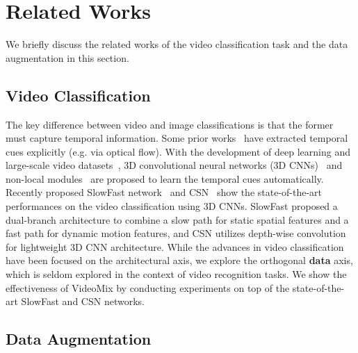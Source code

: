 \section{Related Works}
\label{section:related_works}

We briefly discuss the related works of the video classification task and the data augmentation in this section. 

\subsection{Video Classification}

The key difference between video and image classifications is that the former must capture temporal information.
Some prior works~\cite{simonyan2014two,feichtenhofer2016convolutional,carreira2017quo} have extracted temporal cues explicitly (e.g. via optical flow).
With the development of deep learning and large-scale video datasets~\cite{kinetics,sports1M}, 3D convolutional neural networks (3D CNNs)~\cite{tran2015learning_spatiotemporal,hara2018can_spatiotemporal,carreira2017quo,tran2019CSN} and non-local modules~\cite{wang2018non}  
are proposed to learn the temporal cues automatically.
Recently proposed SlowFast network~\cite{feichtenhofer2019slowfast} and CSN~\cite{tran2019CSN} show the state-of-the-art performances on the video classification using 3D CNNs. 
SlowFast proposed a dual-branch architecture to combine a slow path for static spatial features and a fast path for dynamic motion features, and CSN utilizes depth-wise convolution for lightweight 3D CNN architecture. 
While the advances in video classification have been focused on the architectural axis, we explore the orthogonal \textbf{data} axis, which is seldom explored in the context of video recognition tasks. 
We show the effectiveness of VideoMix by conducting experiments on top of the state-of-the-art SlowFast and CSN networks.


\subsection{Data Augmentation}


